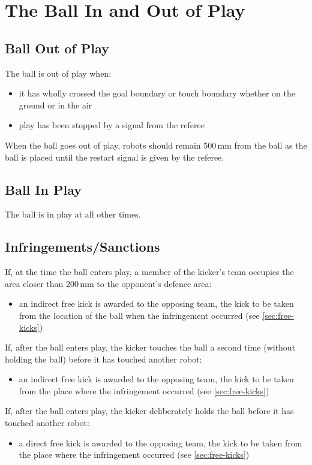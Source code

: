 \section{The Ball In and Out of Play}\label{sec:ball-in-and-out-of-play}

\subsection{Ball Out of Play}
The ball is out of play when:
\begin{itemize}
\item it has wholly crossed the goal boundary or touch boundary whether on the ground or in the air
\item play has been stopped by a signal from the referee
\end{itemize}

When the ball goes out of play, robots should remain 500\,mm from the ball as the ball is placed until the restart signal is given by the referee.

\subsection{Ball In Play}
The ball is in play at all other times.

\subsection{Infringements/Sanctions}
If, at the time the ball enters play, a member of the kicker's team occupies the area closer than 200\,mm to the opponent's defence area:
\begin{itemize}
\item an indirect free kick is awarded to the opposing team, the kick to be taken from the location of the ball when the infringement occurred (see \autoref{sec:free-kicks})
\end{itemize}

If, after the ball enters play, the kicker touches the ball a second time (without holding the ball) before it has touched another robot:
\begin{itemize}
\item an indirect free kick is awarded to the opposing team, the kick to be taken from the place where the infringement occurred (see \autoref{sec:free-kicks})
\end{itemize}

If, after the ball enters play, the kicker deliberately holds the ball before it has touched another robot:
\begin{itemize}
\item a direct free kick is awarded to the opposing team, the kick to be taken from the place where the infringement occurred (see \autoref{sec:free-kicks})
\end{itemize}

